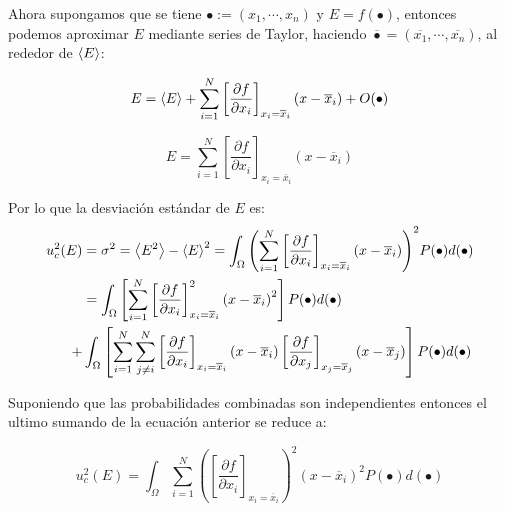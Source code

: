 Ahora supongamos que se tiene $\bullet := (x_1, \cdots, x_n)$ y $E = f(\bullet)$,
entonces podemos aproximar $E$ mediante series de Taylor, haciendo
$\overline{\bullet} = (\overline{x_1}, \cdots, \overline{x_n})$, al rededor
de $\left\langle E\right\rangle$:

\newcommand{\pf}[1]{
\left[
 \frac{\partial f}{\partial x_#1}       
    \right]_{x_#1 = \overline{x}_#1}
}

\begin{equation*}
    E = \mean{E} + \sum_{i=1}^{N}
    \pf{i}(x - \overline{x}_i) + O(\bullet)
\end{equation*}

\begin{equation}
    \label{eq:aprox}
    E = \sum_{i=1}^{N}
    \pf{i}
    (x - \overline{x}_i)
\end{equation}

Por lo que la desviación estándar de $E$ es:
\begin{align*}
  u_c^2 (E) &= \sigma^2 = \mean{E^2}-\mean{E}^2 = \int_{\Omega} {\left(
    \sum_{i=1}^{N}
    \pf{i}(x - \overline{x}_i)
\right)}^2
P(\bullet)d(\bullet)\\
&= \int_\Omega \left[
    \sum_{i=1}^{N}
        \pf{i}^2{(x - \overline{x}_i)}^2
        \right]P(\bullet)d(\bullet)
        \\
        +
        &\int_{\Omega} \left[
            \sum_{i=1}^{N} \sum_{j\neq i}^{N}
        \pf{i} (x - \overline{x}_i)
        \pf{j}(x - \overline{x}_j)
        \right]
        P(\bullet)d(\bullet)
        \\
\end{align*}

Suponiendo que las probabilidades combinadas son independientes
entonces el ultimo sumando de la ecuación anterior se reduce a:

\begin{equation*}
u_c^2(E) = \int_\Omega \sum_{i=1}^{N}
        \left(
        \pf{i}
        \right)^2
        {(x - \overline{x}_i)}^2
        P(\bullet)d(\bullet)
\end{equation*}